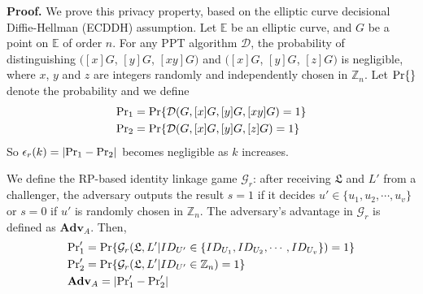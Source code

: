 {{{\vspace{0.75mm}
\noindent\textbf{Proof.}
We prove this privacy property,
 based on the elliptic curve decisional Diffie-Hellman (ECDDH) assumption. %
%
Let $\mathbb{E}$ be an elliptic curve,
    and $G$ be a point on $\mathbb{E}$ of order $n$.
For any PPT algorithm $\mathcal{D}$, the probability of distinguishing
 $([x]G$, $[y]G$, $[xy]G)$ and $([x]G$, $[y]G$, $[z]G)$
is negligible,
 where $x$, $y$ and $z$ are integers randomly and independently chosen in $\mathbb{Z}_n$.
Let  ${\rm Pr}\{\}$ denote the probability and
 we define
\begin{align*}
&{\rm Pr}_1 =  {\rm Pr}\{\mathcal{D}(G, [x]G, [y]G, [xy]G)=1\} \\
&{\rm Pr}_2 =  {\rm Pr}\{\mathcal{D}(G, [x]G, [y]G, [z]G)=1\}
\end{align*}
So $\epsilon_{r}(k) = |{\rm Pr}_1 - {\rm Pr}_2|$ becomes negligible as $k$ increases.


We define the RP-based identity linkage game $\mathcal{G}_r$:
after receiving $\mathfrak{L}$ and $L'$ from a challenger,
    the adversary outputs the result $s = 1$ if it decides $u' \in \{u_1, u_2, \cdots, u_v\}$ or $s = 0$ if $u'$ is randomly chosen in $\mathbb{Z}_n$.
The adversary's advantage in $\mathcal{G}_r$ is defined as $\mathbf{Adv}_{A}$.
Then,
\begin{align*}
&{\rm Pr}'_1={\rm Pr}\{\mathcal{G}_r(\mathfrak{L}, L'|ID_{U'} \in \{ID_{U_1}, ID_{U_2}, \cdots, ID_{U_v}\})=1\} \\
&{\rm Pr}'_2={\rm Pr}\{\mathcal{G}_r(\mathfrak{L}, L'|ID_{U'} \in \mathbb{Z}_n)=1\}\\
&{\mathbf{Adv}}_{A}=|{\rm Pr}'_1-{\rm Pr}'_2|
\end{align*}

}}}
